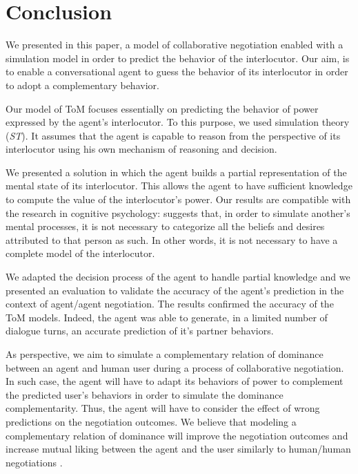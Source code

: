 \documentclass[conference, letterpaper]{IEEEtran}
\begin{document}
	\section{Conclusion}
			
	We presented in this paper, a model of collaborative negotiation enabled with a simulation model in order to predict the behavior of the interlocutor. Our aim, is to enable a conversational agent to guess the behavior of its interlocutor in order to adopt a complementary behavior.
	
	 Our model of ToM focuses essentially on predicting the behavior of power expressed by the agent's interlocutor. To this purpose, we used simulation theory (\emph{ST}). It assumes that the agent is capable to reason from the perspective of its interlocutor using his own mechanism of reasoning and decision.
	  
	We presented a solution in which the agent builds a partial representation of the mental state of its interlocutor. This allows the agent to have sufficient knowledge to compute the value of the interlocutor's power. Our results are compatible with the research in cognitive psychology: \cite{harbers2009modeling} suggests that, in order to simulate another's mental processes, it is not necessary to categorize all the beliefs and desires attributed to that person as such. In other words, it is not necessary to have a complete model of the interlocutor.
	
	We adapted the decision process of the agent to handle partial knowledge and we presented an evaluation to validate the accuracy of the agent's prediction in the context of agent/agent negotiation. The results confirmed the accuracy of the ToM models. Indeed, the agent was able to generate, in a limited number of dialogue turns, an accurate prediction of it's partner behaviors.
	
	As perspective, we aim to simulate a complementary relation of dominance between an agent and human user during a process of collaborative negotiation. In such case, the agent will have to adapt its behaviors of power to complement the predicted user's behaviors in order to simulate the dominance complementarity. Thus, the agent will have to consider the effect of wrong predictions on the negotiation outcomes. We believe that modeling a complementary relation of dominance will improve the negotiation outcomes and increase mutual liking between the agent and the user similarly to human/human negotiations \cite{wiltermuth2015benefits,tiedens2003power}.
	
	
	
	
	
	
	
	
	
\end{document}
